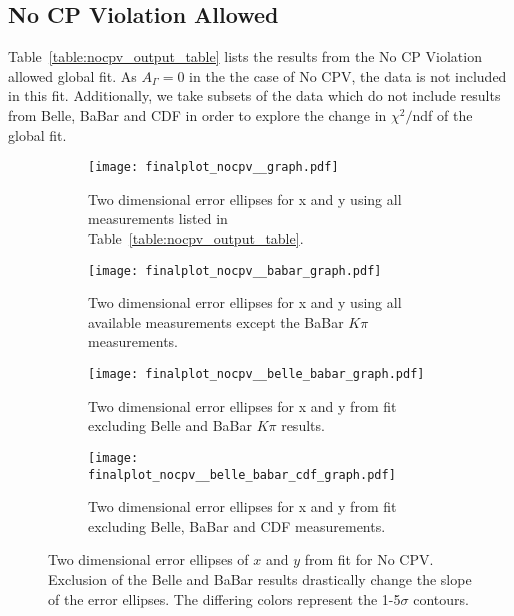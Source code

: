 \subsection{No CP Violation Allowed}
Table~\ref{table:nocpv_output_table} lists the results from the No CP Violation allowed
global fit. As $A_\Gamma =0$ in the the case of No CPV, the data is not included in 
this fit. Additionally, we take subsets of the data which do not include results from
Belle, BaBar and CDF in order to explore the change in $\chi^2/$ndf of the global fit.

\begin{figure}[htb]
  \begin{center}
    \begin{subfigure}[b]{0.4\textwidth}
      \centering
      \texttt{[image: finalplot\_nocpv\_\_graph.pdf]}
      \caption{Two dimensional error ellipses for x and y using all measurements listed in Table~\ref{table:nocpv_output_table}.}
      \label{fig:xy_no_cpv_}
    \end{subfigure}\hspace{3mm}%
    \begin{subfigure}[b]{0.4\textwidth}
      \centering
      \texttt{[image: finalplot\_nocpv\_\_babar\_graph.pdf]}
      \caption{Two dimensional error ellipses for x and y using all available measurements except the BaBar $K\pi$ measurements.}
      \label{fig:xy_no_cpv_no_babar}
    \end{subfigure}%
    
    \begin{subfigure}[b]{0.4\textwidth}
      \centering
      \texttt{[image: finalplot\_nocpv\_\_belle\_babar\_graph.pdf]}
      \caption{Two dimensional error ellipses for x and y from fit excluding Belle and BaBar $K\pi$ results.}
      \label{fig:xy_no_cpv_nobelle_babar}
    \end{subfigure}%
    \hspace{2mm}
    \begin{subfigure}[b]{0.4\textwidth}
      \centering
      \texttt{[image: finalplot\_nocpv\_\_belle\_babar\_cdf\_graph.pdf]}
      \caption{Two dimensional error ellipses for x and y from fit excluding Belle, BaBar and CDF measurements.}
      \label{fig:xy_no_cpv_nocdf}
    \end{subfigure}%
  \end{center}
  \caption{Two dimensional error ellipses of $x$ and $y$ from fit for No CPV. Exclusion of the Belle and BaBar results drastically change the slope of the error ellipses. The differing colors represent the 1-5$\sigma$ contours.}
  \label{fig:xy_nocpv_variations}
\end{figure}


